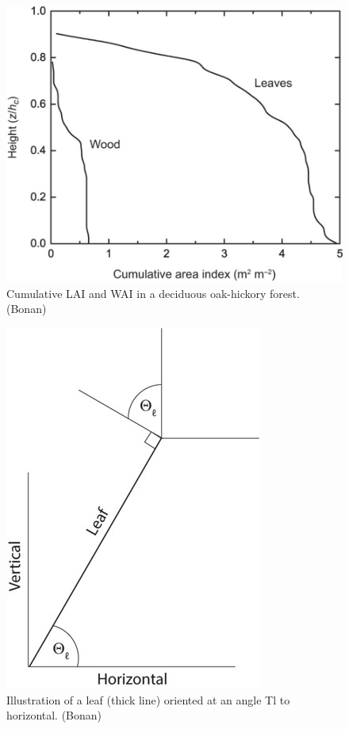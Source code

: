 \documentclass[
  oneside]{book}
\begin{document}
\begin{figure}

{\centering \includegraphics[width=0.8\linewidth]{figures/chap3/f32_cLAI} 

}

\caption{Cumulative LAI and WAI in a deciduous oak-hickory forest. (Bonan)}\label{fig:f32}
\end{figure}
\begin{figure}

{\centering \includegraphics[width=0.8\linewidth]{figures/chap3/f33_Langle} 

}

\caption{Illustration of a leaf (thick line) oriented at an angle Tl to horizontal. (Bonan)}\label{fig:f33}
\end{figure}
\end{document}
